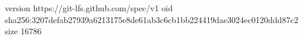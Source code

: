 version https://git-lfs.github.com/spec/v1
oid sha256:3207defab27939a6213175e8de61ab3c6cb1bb224419dae3024ec0120ddd87c2
size 16786
